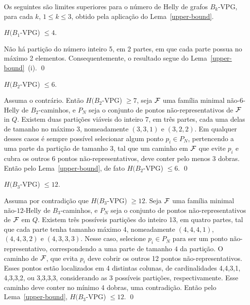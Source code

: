 Os seguintes são limites superiores para o número de Helly de grafos $B_k$-VPG, para cada $k$, $1 \leq k \leq 3$, obtido pela aplicação do Lema~\ref{upper-bound}.      
 
\begin{lema}\label{claim:upper-B1-VPG}
$H(B_1$-VPG) $\leq  4$.
\end{lema}

\proof Não há partição do número inteiro 5, em 2 partes, em que cada parte possua no máximo 2 elementos. Consequentemente, o resultado segue do Lema~\ref{upper-bound}~(i). \qed

\begin{lema}\label{claim:upper-B2-VPG}
$H(B_2$-VPG)  $\leq  6$.
\end{lema}

\proof Assuma o contrário. Então $H(B_2$-VPG) $\geq  7$, seja $\cal F$ uma família minimal não-$6$-Helly de $B_2$-caminhos, e  $P_N$ seja o conjunto de pontos  não-representativos de $\cal F$ in $Q$. Existem duas partições viáveis do inteiro 7, em três partes, cada uma delas de tamanho no máximo 3, nomeadamente $(3,3,1)$ e $(3,2,2)$. Em qualquer desses casos  é sempre possível selecionar algum ponto $p_i \in P_N$, pertencendo a uma parte da partição de tamanho 3, tal que um caminho em  $\cal F$  que evite $p_i$ e cubra os outros  6 pontos não-representativos, deve conter pelo menos  3 dobras.  Então pelo Lema~\ref{upper-bound}, de fato $H(B_2$-VPG)  $\leq  6$. \qed


\begin{lema}\label{claim:upper-B3-VPG}
$H(B_3$-VPG) $\leq  12$.
\end{lema}

\proof Assuma por contradição que $H(B_3$-VPG) $\geq  12$. Seja $\cal F$ uma família minimal não-$12$-Helly de $B_3$-caminhos, e $P_N$ seja o conjunto de pontos não-representativos de $\cal F$ em $Q$. Existem três possíveis partições do inteiro 13, em quatro partes, tal que cada parte tenha tamanho máximo 4, nomeadamente $(4,4,4,1)$, $(4,4,3,2)$ e $(4,3,3,3)$. Nesse caso, selecione $p_i \in P_N$ para ser um ponto  não-representativo, correspondendo a uma parte de tamanho $4$ da partição.  O caminho de ${\cal F}$, que evita $p_i$ deve cobrir os outros 12 pontos não-representativos. Esses pontos estão localizados em 4 distintas colunas, de cardinalidades 4,4,3,1, 4,3,3,2, ou 3,3,3,3, considerando as 3 possíveis partições, respectivamente. Esse caminho deve conter no mínimo 4 dobras, uma contradição. Então pelo Lema~\ref{upper-bound}, $H(B_3$-VPG) $\leq  12$.    \qed  

